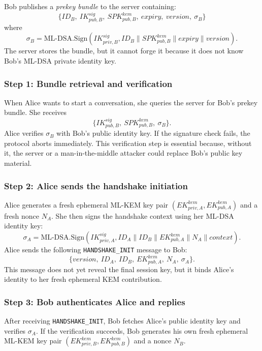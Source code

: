 \documentclass{article}
\begin{document}
      Bob publishes a \emph{prekey bundle} to the server containing:
      \[
            \{ID_B,\ IK^{sig}_{pub,B},\ SPK^{kem}_{pub,B},\ expiry,\ version,\ \sigma_B\}
      \]
      where
      \[
            \sigma_B = \text{ML-DSA.Sign}(IK^{sig}_{priv,B}, ID_B \parallel SPK^{kem}_{pub,B} \parallel expiry \parallel version).
      \]
      The server stores the bundle, but it cannot forge it because it does not
      know Bob's ML-DSA private identity key.

      \subsubsection{Step 1: Bundle retrieval and verification}
      When Alice wants to start a conversation, she queries the server for Bob's
      prekey bundle. She receives
      \[
            \{IK^{sig}_{pub,B},\ SPK^{kem}_{pub,B},\ \sigma_B\}.
      \]
      Alice verifies $\sigma_B$ with Bob's public identity key. If the signature
      check fails, the protocol aborts immediately. This verification step is
      essential because, without it, the server or a man-in-the-middle attacker
      could replace Bob's public key material.

      \subsubsection{Step 2: Alice sends the handshake initiation}
      Alice generates a fresh ephemeral ML-KEM key pair
      $(EK^{kem}_{priv,A}, EK^{kem}_{pub,A})$ and a fresh nonce $N_A$. She then
      signs the handshake context using her ML-DSA identity key:
      \[
            \sigma_A = \text{ML-DSA.Sign}(IK^{sig}_{priv,A},
            ID_A \parallel ID_B \parallel EK^{kem}_{pub,A} \parallel N_A \parallel context).
      \]
      Alice sends the following \texttt{HANDSHAKE\_INIT} message to Bob:
      \[
            \{version,\ ID_A,\ ID_B,\ EK^{kem}_{pub,A},\ N_A,\ \sigma_A\}.
      \]
      This message does not yet reveal the final session key, but it binds
      Alice's identity to her fresh ephemeral KEM contribution.

      \subsubsection{Step 3: Bob authenticates Alice and replies}
      After receiving \texttt{HANDSHAKE\_INIT}, Bob fetches Alice's public
      identity key and verifies $\sigma_A$. If the verification succeeds, Bob
      generates his own fresh ephemeral ML-KEM key pair
      $(EK^{kem}_{priv,B}, EK^{kem}_{pub,B})$ and a nonce $N_B$.
\end{document}

